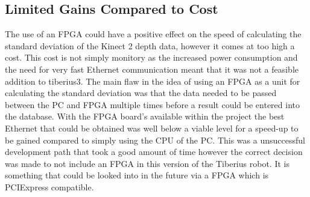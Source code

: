 \subsection{Limited Gains Compared to Cost}
The use of an \gls{FPGA} could have a positive effect on the speed of calculating the standard deviation of the Kinect 2 depth data, however it comes at too high a cost. This cost is not simply monitory as the increased power consumption and the need for very fast Ethernet communication meant that it was not a feasible addition to \gls{tiberius3}. The main flaw in the idea of using an \gls{FPGA} as a unit for calculating the standard deviation was that the data needed to be passed between the PC and \gls{FPGA} multiple times before a result could be entered into the database. With the \gls{FPGA} board's available within the project the best Ethernet that could be obtained was well below a viable level for a speed-up to be gained compared to simply using the CPU of the PC. This was a unsuccessful development path that took a good amount of time however the correct decision was made to not include an \gls{FPGA} in this version of the Tiberius robot. It is something that could be looked into in the future via a FPGA which is PCIExpress compatible.

\pagestyle{stuart}













